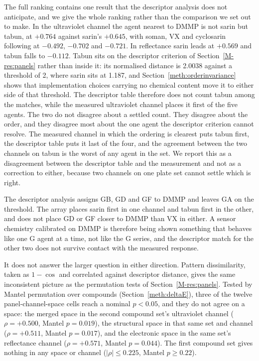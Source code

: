 \documentclass[journal=jacsat,manuscript=suppinfo,margin=1in]{achemso}
\begin{document}
The full ranking contains one result that the descriptor analysis does not
anticipate, and we give the whole ranking rather than the comparison we set out
to make. In the ultraviolet channel the agent nearest to DMMP is not sarin but
tabun, at $+0.764$ against sarin's $+0.645$, with soman, VX and cyclosarin
following at $-0.492$, $-0.702$ and $-0.721$. In reflectance sarin leads at
$+0.569$ and tabun falls to $-0.112$. Tabun sits on the descriptor criterion of
Section~\ref{M-res:panels} rather than inside it: its normalised distance is
2.0038 against a threshold of 2, where sarin sits at 1.187, and
Section~\ref{meth:orderinvariance} shows that implementation choices carrying no
chemical content move it to either side of that threshold. The descriptor table
therefore does not count tabun among the matches, while the measured ultraviolet
channel places it first of the five agents. The two do not disagree about a
settled count. They disagree about the order, and they disagree most about the
one agent the descriptor criterion cannot resolve. The measured channel in which the
ordering is clearest puts tabun first, the descriptor table puts it last of the
four, and the agreement between the two channels on tabun is the worst of any
agent in the set.
We report this as a disagreement between the descriptor table and the measurement
and not as a correction to either, because two channels on one plate set cannot
settle which is right.

The descriptor analysis assigns GB, GD and GF to DMMP and leaves GA on the
threshold. The array places sarin first in one channel and tabun first in the
other, and does not place GD or GF closer to DMMP than VX in either. A sensor chemistry calibrated on DMMP is
therefore being shown something that behaves like one G agent at a time, not like
the G series, and the descriptor match for the other two does not survive contact
with the measured response.

It does not answer the larger question in either direction. Pattern
dissimilarity, taken as $1 - \cos$ and correlated against descriptor distance,
gives the same inconsistent picture as the permutation tests of
Section~\ref{M-res:panels}. Tested by Mantel permutation over compounds
(Section~\ref{meth:deltaE}), three of the twelve panel-channel-space cells reach a
nominal $p<0.05$, and they do not agree on a space: the merged space in the
second compound set's ultraviolet channel ($\rho = +0.500$, Mantel $p = 0.019$),
the structural space in that same set and channel ($\rho = +0.511$, Mantel
$p = 0.017$),
and the electronic space in the same set's reflectance channel ($\rho = +0.571$,
Mantel $p = 0.044$). The first compound set gives nothing in any space or
channel ($|\rho| \le 0.225$, Mantel $p \ge 0.22$).
\end{document}
